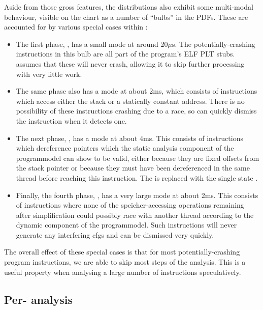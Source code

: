 Aside from those gross features, the distributions also exhibit some
multi-modal behaviour, visible on the chart as a number of ``bulbs''
in the PDFs.  These are accounted for by various special cases within
{\implementation}:
\begin{itemize}
\item The first phase, , has a small mode
  at around 20$\mu$s.  The potentially-crashing instructions in this
  bulb are all part of the program's ELF PLT stubs.  {\implementation}
  assumes that these will never crash, allowing it to skip further
  processing with very little work.
\item The same phase also has a mode at about 2ms, which consists of
  instructions which access either the stack or a statically constant
  address.  There is no possibility of these instructions crashing due
  to a race, so {\implementation} can quickly dismiss the instruction
  when it detects one.
\item The next phase, , has a mode at about 4ms.  This
  consists of instructions which dereference pointers which the static
  analysis component of the \gls{programmodel} can show to be valid,
  either because they are fixed offsets from the stack pointer or
  because they must have been dereferenced in the same thread before
  reaching this instruction.  The {\StateMachine} is replaced with the
  single state {\stSurvive}.
\item Finally, the fourth phase, , has a very large mode
  at about 2ms.  This consists of instructions where none of the
  \gls{speicher}-accessing operations remaining after {\StateMachine}
  simplification could possibly race with another thread according to
  the dynamic component of the \gls{programmodel}.  Such instructions
  will never generate any interfering \glspl{cfg} and can be dismissed
  very quickly.
\end{itemize}
The overall effect of these special cases is that for most
potentially-crashing program instructions, we are able to skip most
steps of the analysis.  This is a useful property when analysing a
large number of instructions speculatively.

\subsection{Per- analysis}
\label{sect:eval:how:per_interfering}

